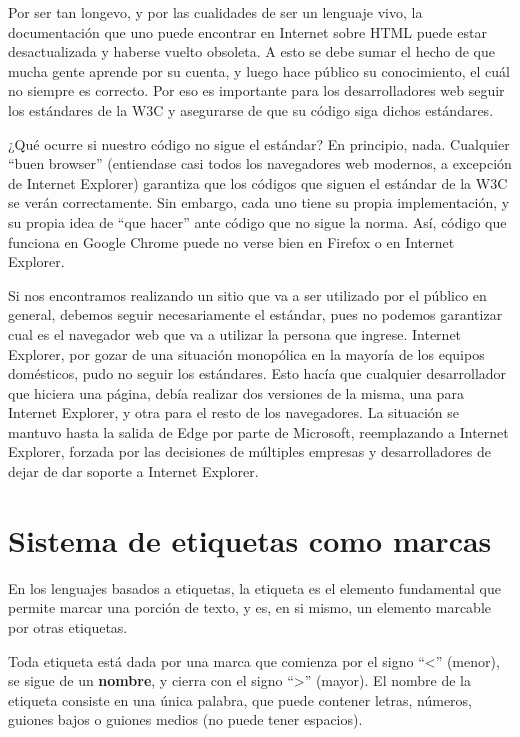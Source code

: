 Por ser tan longevo, y por las cualidades de ser un lenguaje vivo, la documentación
que uno puede encontrar en Internet sobre HTML puede estar desactualizada y haberse
vuelto obsoleta. A esto se debe sumar el hecho de que mucha gente aprende por su
cuenta, y luego hace público su conocimiento, el cuál no siempre es correcto. Por
eso es importante para los desarrolladores web seguir los estándares de la W3C y
asegurarse de que su código siga dichos estándares.

¿Qué ocurre si nuestro código no sigue el estándar? En principio, nada.
Cualquier ``buen browser'' (entiendase casi todos los navegadores web modernos,
a excepción de Internet Explorer) garantiza que los códigos que siguen el
estándar de la W3C se verán correctamente. Sin embargo, cada uno tiene su
propia implementación, y su propia idea de ``que hacer'' ante código que no
sigue la norma. Así, código que funciona en Google Chrome puede no verse bien
en Firefox o en Internet Explorer. 

Si nos encontramos realizando un sitio que va a ser utilizado por el público en
general, debemos seguir necesariamente el estándar, pues no podemos garantizar
cual es el navegador web que va a utilizar la persona que ingrese. Internet
Explorer, por gozar de una situación monopólica en la mayoría de los equipos
domésticos, pudo no seguir los estándares. Esto hacía que cualquier desarrollador
que hiciera una página, debía realizar dos versiones de la misma, una para
Internet Explorer, y otra para el resto de los navegadores. La situación se
mantuvo hasta la salida de Edge por parte de Microsoft, reemplazando a Internet
Explorer, forzada por las decisiones de múltiples empresas y desarrolladores de
dejar de dar soporte a Internet Explorer.

\section{Sistema de etiquetas como marcas}

En los lenguajes basados a etiquetas, la etiqueta es el elemento fundamental
que permite marcar una porción de texto, y es, en si mismo, un elemento marcable
por otras etiquetas.

Toda etiqueta está dada por una marca que comienza por el signo ``<'' (menor),
se sigue de un \textbf{nombre}, y cierra con el signo ``>'' (mayor). El nombre
de la etiqueta consiste en una única palabra, que puede contener letras, números,
guiones bajos o guiones medios (no puede tener espacios).

